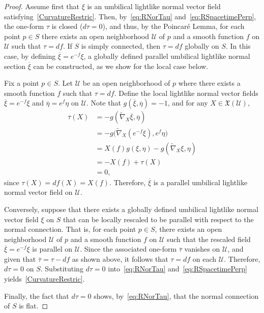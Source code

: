 \documentclass[11pt]{article}
\numberwithin{equation}{section}
\begin{document}
	\begin{proof}
		Assume first that $\xi$ is an umbilical lightlike normal vector field satisfying~\eqref{CurvatureRestric}. Then, by~\eqref{eq:RNorTau} and~\eqref{eq:RSpacetimePerp}, the one-form $\tau$ is closed ($d\tau = 0$), and thus, by the Poincaré Lemma, for each point $p \in S$ there exists an open neighborhood $\mathscr{U}$ of $p$ and a smooth function $f$ on $\mathscr{U}$ such that $\tau = df$. If $S$ is simply connected, then $\tau = df$ globally on $S$. In this case, by defining $\overline{\xi} = e^{-f} \xi$, a globally defined parallel umbilical lightlike normal section $\overline{\xi}$ can be constructed, as we show for the local case below.
		
		Fix a point $p \in S$. Let $\mathscr{U}$ be an open neighborhood of $p$ where there exists a smooth function $f$ such that $\tau = df$. Define the local lightlike normal vector fields $\overline{\xi} = e^{-f} \xi$ and $\overline{\eta} = e^{f} \eta$ on $\mathscr{U}$. Note that $g(\overline{\xi}, \overline{\eta}) = -1$, and for any $X \in \mathfrak{X}(\mathscr{U})$,
		\begin{align*}
			\overline{\tau}(X) &= -g(\widetilde{\nabla}_X \overline{\xi}, \overline{\eta}) \\
			&= -g\bigl(\widetilde{\nabla}_X (e^{-f} \xi), e^{f} \eta\bigr) \\
			&= X(f)g(\xi,\eta) - g(\widetilde{\nabla}_X \xi, \eta) \\
			&= -X(f) + \tau(X) \\
			&= 0,
		\end{align*}
		since $\tau(X) = df(X) = X(f)$. Therefore, $\overline{\xi}$ is a parallel umbilical lightlike normal vector field on $\mathscr{U}$.
		
		Conversely, suppose that there exists a globally defined umbilical lightlike normal vector field $\xi$ on $S$ that can be locally rescaled to be parallel with respect to the normal connection. That is, for each point $p \in S$, there exists an open neighborhood $\mathscr{U}$ of $p$ and a smooth function $f$ on $\mathscr{U}$ such that the rescaled field $\overline{\xi} = e^{-f}\xi$ is parallel on $\mathscr{U}$. Since the associated one-form $\overline{\tau}$ vanishes on $\mathscr{U}$, and given that $\overline{\tau} = \tau - df$ as shown above, it follows that $\tau = df$ on each $\mathscr{U}$. Therefore, $d\tau = 0$ on $S$. Substituting $d\tau = 0$ into~\eqref{eq:RNorTau} and~\eqref{eq:RSpacetimePerp} yields~\eqref{CurvatureRestric}.
		
		Finally, the fact that $d\tau = 0$ shows, by~\eqref{eq:RNorTau}, that the normal connection of $S$ is flat.
	\end{proof}
\end{document}
